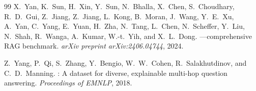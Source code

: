 \documentclass{zapiski}
\begin{document}
\begin{thebibliography}{99}
X.~Yan, K.~Sun, H.~Xin, Y.~Sun, N.~Bhalla, X.~Chen, S.~Choudhary, R.~D.~Gui, Z.~Jiang, Z.~Jiang, L.~Kong, B.~Moran, J.~Wang, Y.~E.~Xu, A.~Yan, C.~Yang, E.~Yuan, H.~Zha, N.~Tang, L.~Chen, N.~Scheffer, Y.~Liu, N.~Shah, R.~Wanga, A.~Kumar, W.-t.~Yih, and X.~L.~Dong.
---comprehensive {RAG} benchmark.
\newblock \emph{arXiv preprint arXiv:2406.04744}, 2024.

Z.~Yang, P.~Qi, S.~Zhang, Y.~Bengio, W.~W.~Cohen, R.~Salakhutdinov, and C.~D.~Manning.
: A dataset for diverse, explainable multi-hop question answering.
\newblock \emph{Proceedings of EMNLP}, 2018.

\end{thebibliography}
\end{document}
